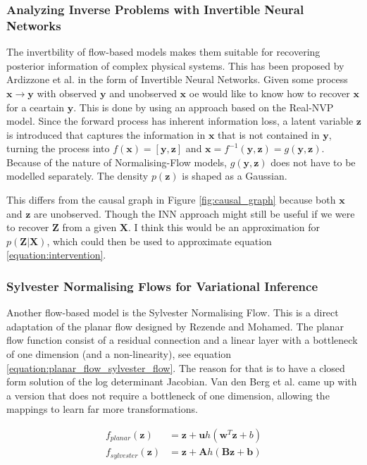 \documentclass{article}
\newcommand{\bA}{\mathbf{A}}
\newcommand{\bB}{\mathbf{B}}
\newcommand{\bb}{\mathbf{b}}
\newcommand{\bu}{\mathbf{u}}
\newcommand{\bw}{\mathbf{w}}
\newcommand{\bX}{\mathbf{X}}
\newcommand{\bx}{\mathbf{x}}
\newcommand{\by}{\mathbf{y}}
\newcommand{\bZ}{\mathbf{Z}}
\newcommand{\bz}{\mathbf{z}}
\begin{document}
\subsubsection*{Analyzing Inverse Problems with Invertible Neural Networks}
The invertbility of flow-based models makes them suitable for recovering posterior information of complex physical systems. This has been proposed by Ardizzone et al. \cite{ardizzone2018analyzing} in the form of Invertible Neural Networks. Given some process $\bx \rightarrow \by$ with observed $\by$ and unobserved $\bx$ oe would like to know how to recover $\bx$ for a ceartain $\by$. This is done by using an approach based on the Real-NVP\cite{dinh2016density} model. Since the forward process has inherent information loss, a latent variable $\bz$ is introduced that captures the information in $\bx$ that is not contained in $\by$, turning the process into $f(\bx) = [\by, \bz]$  and $\bx = f^{-1}(\by, \bz) = g(\by, \bz)$. Because of the nature of Normalising-Flow models, $g(\by, \bz)$ does not have to be modelled separately. The density $p(\bz)$ is shaped as a Gaussian. 

This differs from the causal graph in Figure \ref{fig:causal_graph} because both $\bx$ and $\bz$ are unobserved. Though the INN approach might still be useful if we were to recover $\bZ$ from a given $\bX$. I think this would be an approximation for $p(\bZ | \bX)$, which could then be used to approximate equation \ref{equation:intervention}. %


\subsubsection*{Sylvester Normalising Flows for Variational Inference}
Another flow-based model is the Sylvester Normalising Flow\cite{berg2018sylvester}. This is a direct adaptation of the planar flow designed by Rezende and Mohamed. The planar flow function consist of a residual connection and a linear layer with a bottleneck of one dimension (and a non-linearity), see equation \ref{equation:planar_flow_sylvester_flow}. The reason for that is to have a closed form solution of the log determinant Jacobian. Van den Berg et al. came up with a version that does not require a bottleneck of one dimension, allowing the mappings to learn far more transformations.

\begin{align}\label{equation:planar_flow_sylvester_flow}
    f_{planar}(\bz) &= \bz + \bu h(\bw^T\bz + b)\\
    f_{sylvester}(\bz) &= \bz + \bA h(\bB\bz + \bb)
\end{align}
\end{document}
